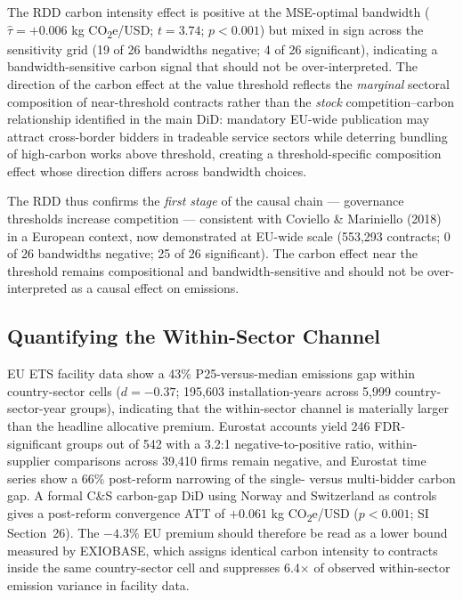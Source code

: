 \documentclass[11pt,a4paper]{article}
\begin{document}
The RDD carbon intensity effect is positive at the MSE-optimal bandwidth ($\hat{\tau} = +0.006$ kg CO\textsubscript{2}e/USD; $t = 3.74$; $p < 0.001$) but mixed in sign across the sensitivity grid (19 of 26 bandwidths negative; 4 of 26 significant), indicating a bandwidth-sensitive carbon signal that should not be over-interpreted. The direction of the carbon effect at the value threshold reflects the \textit{marginal} sectoral composition of near-threshold contracts rather than the \textit{stock} competition--carbon relationship identified in the main DiD: mandatory EU-wide publication may attract cross-border bidders in tradeable service sectors while deterring bundling of high-carbon works above threshold, creating a threshold-specific composition effect whose direction differs across bandwidth choices.

The RDD thus confirms the \textit{first stage} of the causal chain --- governance thresholds increase competition --- consistent with Coviello \& Mariniello (2018) in a European context, now demonstrated at EU-wide scale (553,293 contracts; 0 of 26 bandwidths negative; 25 of 26 significant). The carbon effect near the threshold remains compositional and bandwidth-sensitive and should not be over-interpreted as a causal effect on emissions.




\subsection{Quantifying the Within-Sector Channel}

EU ETS facility data show a 43\% P25-versus-median emissions gap within country-sector cells ($d = -0.37$; 195,603 installation-years across 5,999 country-sector-year groups), indicating that the within-sector channel is materially larger than the headline allocative premium. Eurostat accounts yield 246 FDR-significant groups out of 542 with a 3.2:1 negative-to-positive ratio, within-supplier comparisons across 39,410 firms remain negative, and Eurostat time series show a 66\% post-reform narrowing of the single- versus multi-bidder carbon gap. A formal C\&S carbon-gap DiD using Norway and Switzerland as controls gives a post-reform convergence ATT of $+0.061$ kg CO\textsubscript{2}e/USD ($p < 0.001$; SI Section~26). The $-4.3\%$ EU premium should therefore be read as a lower bound measured by EXIOBASE, which assigns identical carbon intensity to contracts inside the same country-sector cell and suppresses 6.4$\times$ of observed within-sector emission variance in facility data.
\end{document}
